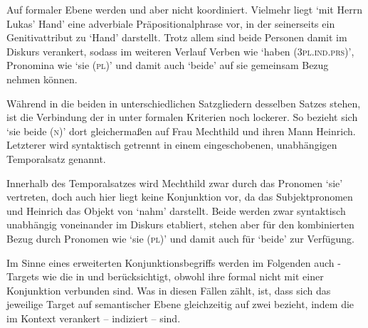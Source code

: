Auf formaler Ebene werden  und  aber nicht
koordiniert. Vielmehr liegt  `mit
Herrn Lukas' Hand' eine adverbiale Präpositionalphrase vor, in
der  seinerseits ein Genitivattribut zu 
`Hand' darstellt. Trotz allem sind beide Personen damit im Diskurs
verankert, sodass im weiteren Verlauf Verben wie 
`haben (\textsc{3pl.ind.prs})', Pronomina wie  `sie (\textsc{pl})'
und damit auch  `beide' auf sie gemeinsam Bezug nehmen können.

Während in  die beiden  in
unterschiedlichen Satzgliedern desselben Satzes stehen, ist die Verbindung der
 in  unter formalen Kriterien noch
lockerer. So bezieht sich  `sie beide (\textsc{n})' dort
gleichermaßen auf Frau Mechthild und ihren Mann Heinrich. Letzterer wird
syntaktisch getrennt in einem eingeschobenen, unabhängigen Temporalsatz
genannt.


Innerhalb des Temporalsatzes wird Mechthild zwar durch das Pronomen 
`sie' vertreten, doch auch hier liegt keine Konjunktion vor, da  das
Subjektpronomen und Heinrich das Objekt von  `nahm' darstellt. Beide
 werden zwar syntaktisch unabhängig voneinander im Diskurs
etabliert, stehen aber für den kombinierten Bezug durch Pronomen wie
 `sie (\textsc{pl})' und damit auch für 
`beide' zur Verfügung.

Im Sinne eines erweiterten Konjunktionsbegriffs werden im Folgenden auch
-Targets wie die in  und
 berücksichtigt, obwohl ihre  formal
nicht mit einer Konjunktion verbunden sind. Was in diesen Fällen zählt, ist,
dass sich das jeweilige Target auf semantischer Ebene gleichzeitig auf zwei
 bezieht, indem die  im Kontext
verankert -- indiziert -- sind.

